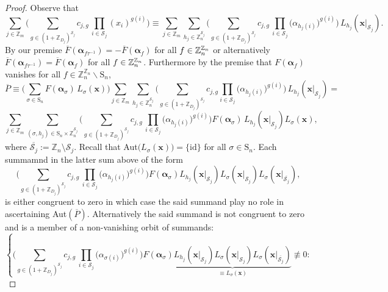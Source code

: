 \begin{proof}
 Observe that
\[
\sum_{j\in\mathbb{Z}_{m}}\big(\sum_{g\in(1+\mathbb{Z}_{D_{j}})^{\mathscr{S}_{j}}}c_{j,g}\,\prod_{i\in\mathscr{S}_{j}}(x_{i})^{g(i)}\big)\equiv\sum_{j\in\mathbb{Z}_{m}}\sum_{h_{j}\in\mathbb{Z}_{n}^{\mathscr{S}_{j}}}\bigg(\sum_{g\in(1+\mathbb{Z}_{D_{j}})^{\mathscr{S}_{j}}}c_{j,g}\,\prod_{i\in\mathscr{S}_{j}}\big(\alpha_{h_{j}(i)}\big)^{g(i)}\bigg)\,L_{h_{j}}(\mathbf{x}|_{\mathscr{S}_{j}}).
\]
By our premise $\overline{F}(\boldsymbol{\alpha}_{f\tau^{-1}})=- \overline{F}(\boldsymbol{\alpha}_{f})$ for all $f\in {\mathbb Z}_{n}^{{\mathbb Z}_{n}}$ or alternatively $\overline{F}(\boldsymbol{\alpha}_{f\tau^{-1}})= \overline{F}(\boldsymbol{\alpha}_{f})$ for all $f\in {\mathbb Z}_{n}^{{\mathbb Z}_{n}}$. Furthermore by the premise that $F(\boldsymbol{\alpha}_{f})$ vanishes for all $f\in \mathbb{Z}_{n}^{\mathbb{Z}_{n}}\backslash\text{S}_{n}$,
\[
\overline{P}\equiv\big(\sum_{\sigma\in\text{S}_{n}}F(\boldsymbol{\alpha}_{\sigma})\,L_{\sigma}(\mathbf{x})\big)\sum_{j\in\mathbb{Z}_{m}}\sum_{h_{j}\in\mathbb{Z}_{n}^{\mathscr{S}_{j}}}\bigg(\sum_{g\in(1+\mathbb{Z}_{D_{j}})^{\mathscr{S}_{j}}}c_{j,g}\prod_{i\in\mathscr{S}_{j}}\big(\alpha_{h_{j}(i)}\big)^{g(i)}\bigg)\,L_{h_{j}}(\mathbf{x}|_{\mathscr{S}_{j}})=
\]
\[
\sum_{j\in\mathbb{Z}_{m}}\sum_{(\sigma,h_{j})\in\text{S}_{n}\times\mathbb{Z}_{n}^{\mathscr{S}_{j}}}\bigg(\sum_{g\in(1+\mathbb{Z}_{D_{j}})^{\mathscr{S}_{j}}}c_{j,g}\,\prod_{i\in\mathscr{S}_{j}}\big(\alpha_{h_{j}(i)}\big)^{g(i)}\bigg)F(\boldsymbol{\alpha}_{\sigma})\,L_{h_{j}}(\mathbf{x}|_{\mathscr{S}_{j}})L_{\sigma}(\mathbf{x}),
\]
where $\overline{\mathscr{S}_{j}}:=\mathbb{Z}_n\setminus \mathscr{S}_{j}$. Recall that Aut$\big(L_{\sigma}(\mathbf{x})\big)=\{\text{id}\}$ for all $\sigma \in \text{S}_n$. Each summamnd in the latter sum above of the form
\[
\bigg(\sum_{g\in(1+\mathbb{Z}_{D_{j}})^{\mathscr{S}_{j}}}c_{j,g}\,\prod_{i\in\mathscr{S}_{j}}\big(\alpha_{h_j(i)}\big)^{g(i)}\bigg)F(\boldsymbol{\alpha}_{\sigma})L_{h_{j}}(\mathbf{x}|_{\mathscr{S}_{j}})L_{\sigma}(\mathbf{x}|_{\mathscr{S}_{j}})L_{\sigma}(\mathbf{x}|_{\overline{\mathscr{S}_{j}}}),
\]
is either congruent to zero in which case the said summand play no role in ascertaining Aut$(\overline{P})$. Alternatively the said summand is not congruent to zero and is a member of a non-vanishing orbit of summands:\\
\[
\left\{ \bigg(\sum_{g\in(1+\mathbb{Z}_{D_{j}})^{\mathscr{S}_{j}}}c_{j,g}\,\prod_{i\in\mathscr{S}_{j}}\big(\alpha_{\sigma(i)}\big)^{g(i)}\bigg)F(\boldsymbol{\alpha}_{\sigma})\underbrace{L_{h_{j}}(\mathbf{x}|_{\mathscr{S}_{j}})L_{\sigma}(\mathbf{x}|_{\mathscr{S}_{j}})L_{\sigma}(\mathbf{x}|_{\overline{\mathscr{S}_{j}}})}_{\equiv L_{\sigma}(\mathbf{x})}\not\equiv0:\begin{array}{c}

\end{array}\]
\end{proof}

